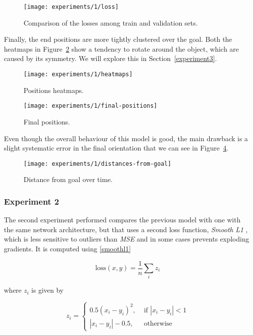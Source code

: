\begin{figure}[htbp]
\centerline{\texttt{[image: experiments/1/loss]}}
	\caption{Comparison of the losses among train and validation sets.}
	\label{fig:loss}
\end{figure}

Finally, the end positions are more tightly clustered over the goal.
Both the heatmaps in Figure~\ref{fig:heatmaps} show a tendency to rotate around 
the object, which are caused by its symmetry. We will explore this in 
Section~\ref{experiment3}.

\begin{figure}[htbp]
	\centerline{\texttt{[image: experiments/1/heatmaps]}}
	\caption{Positions heatmaps.}
	\label{fig:heatmaps}
\end{figure}

\begin{figure}[htbp]
	\centerline{\texttt{[image: experiments/1/final-positions]}}
	\caption{Final positions.}
	\label{fig:final-positions}
\end{figure}

Even though the overall behaviour of this model is good, the main drawback is a 
slight systematic error in the final orientation that we can see in 
Figure~\ref{fig:distance-from-goal-learned}.

\begin{figure}[htbp]
	\centerline{\texttt{[image: experiments/1/distances-from-goal]}}
	\caption{Distance from goal over time.}
	\label{fig:distance-from-goal-learned}
\end{figure}

\subsubsection{Experiment 2}
The second experiment performed compares the previous model with one with the 
same network architecture, but that uses a second loss function, \emph{Smooth 
L1} \cite{smoothl1}, which is less sensitive to outliers than \emph{MSE} and in 
some cases prevents exploding gradients. It is computed using \eqref{smoothl1}

\begin{equation}
\text{loss}(x, y) = \frac{1}{n}\sum_{i}z_i
\label{smoothl1}
\end{equation}

where $z_i$ is given by

\begin{equation}
z_i = 
\begin{cases}
0.5 (x_i-y_i)^2, &\text{ if } |x_i-y_i|<1 \\
|x_i-y_i| - 0.5, &\text{ otherwise}
\end{cases}
\end{equation}


